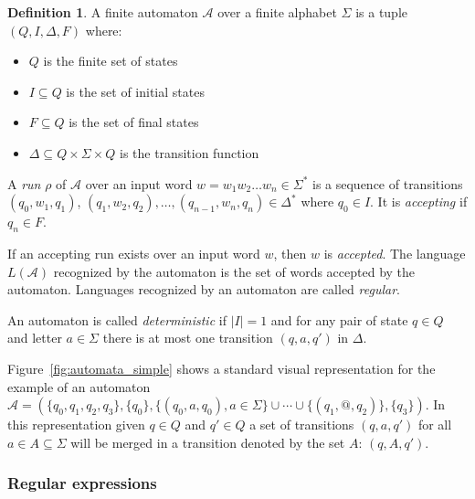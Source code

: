 \documentclass[12px]{article}
\theoremstyle{definition}
\newtheorem{definition}{Definition}
\begin{document}
      \begin{definition}
        A finite automaton $\mathcal{A}$ over a finite alphabet $\Sigma$ is a
        tuple $(Q, I, \Delta, F)$ where:
          \begin{itemize}
            \item $Q$ is the finite set of states
            \item $I \subseteq Q$ is the set of initial states
            \item $F \subseteq Q$ is the set of final states
            \item $\Delta \subseteq Q \times \Sigma \times Q$ is the transition
              function
          \end{itemize}

          A \textit{run} $\rho$ of $\mathcal{A}$ over an input word $w= w_1 w_2
          \ldots w_n \in \Sigma^*$ is a sequence of transitions $(q_0, w_1,
          q_1)$, $(q_1, w_2, q_2), \ldots, (q_{n-1}, w_n, q_n) \in \Delta^*$
          where $q_0 \in I$. It is \textit{accepting} if $q_n \in F$.

          If an accepting run exists over an input word $w$, then $w$ is
          \textit{accepted}. The language $L(\mathcal{A})$ recognized by the
          automaton is the set of words accepted by the automaton. Languages
          recognized by an automaton are called \textit{regular}.

          An automaton is called \textit{deterministic} if $|I| = 1$ and for
          any pair of state $q \in Q$ and letter $a \in \Sigma$ there is at
          most one transition $(q, a, q')$ in $\Delta$.
        \end{definition}

        Figure~\ref{fig:automata_simple} shows a standard visual representation
        for the example of an automaton $\mathcal{A} = (\{q_0, q_1, q_2, q_3\},
        \{q_0\}, \{(q_0, a, q_0), a \in \Sigma\} \cup \cdots \cup \{(q_1,
        \texttt{@}, q_2)\},\{q_3\})$. In this representation given $q \in Q$
        and $q' \in Q$ a set of transitions $(q, a, q')$ for all $a \in A
        \subseteq \Sigma$ will be merged in a transition denoted by the set
        $A$: $(q, A, q')$.

      \subsubsection{Regular expressions}%
        \label{sec:def:regex}
\end{document}
